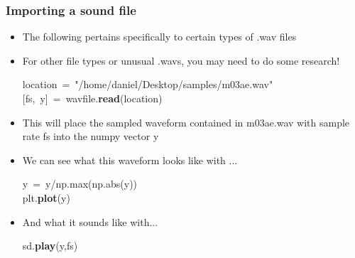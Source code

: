 \documentclass{beamer}\usepackage[]{graphicx}\usepackage[]{color}
\makeatletter
\newcommand{\hlstr}[1]{\textcolor[rgb]{0.192,0.494,0.8}{#1}}%
\newcommand{\hlopt}[1]{\textcolor[rgb]{0,0,0}{#1}}%
\newcommand{\hlstd}[1]{\textcolor[rgb]{0.345,0.345,0.345}{#1}}%
\newcommand{\hlkwb}[1]{\textcolor[rgb]{0.69,0.353,0.396}{#1}}%
\newcommand{\hlkwd}[1]{\textcolor[rgb]{0.737,0.353,0.396}{\textbf{#1}}}%
\newenvironment{kframe}{%
 \def\at@end@of@kframe{}%
 \ifinner\ifhmode%
  \def\at@end@of@kframe{\end{minipage}}%
  \begin{minipage}{\columnwidth}%
 \fi\fi%
 \def\FrameCommand##1{\hskip\@totalleftmargin \hskip-\fboxsep
 \colorbox{shadecolor}{##1}\hskip-\fboxsep
     \hskip-\linewidth \hskip-\@totalleftmargin \hskip\columnwidth}%
 \MakeFramed {\advance\hsize-\width
   \@totalleftmargin\z@ \linewidth\hsize
   \@setminipage}}%
 {\par\unskip\endMakeFramed%
 \at@end@of@kframe}
\newenvironment{knitrout}{}{} %
\makeatother
\begin{document}
\begin{frame}[fragile]
\frametitle{Importing a sound file}
\begin{itemize}
	\item The following pertains specifically to certain types of .wav files
	\item For other file types or unusual .wavs, you may need to do some research!
\begin{knitrout}
\color{fgcolor}\begin{kframe}
\noindent
\ttfamily
\hlstd{location\ }\hlopt{=\ }\hlstd{}\hlstr{"/home/daniel/Desktop/samples/m03ae.wav"}\hlstd{}\hspace*{\fill}\\
\hlopt{{[}}\hlstd{fs}\hlopt{,\ }\hlstd{y}\hlopt{{]}\ =\ }\hlstd{wavfile}\hlopt{.}\hlstd{}\hlkwd{read}\hlstd{}\hlopt{(}\hlstd{location}\hlopt{)}\hlstd{}\hspace*{\fill}
\mbox{}
\normalfont
\end{kframe}
\end{knitrout}

	\item This will place the sampled waveform contained in m03ae.wav with sample rate fs into the numpy vector y

	\item We can see what this waveform looks like with ...

\begin{knitrout}
\color{fgcolor}\begin{kframe}
\noindent
\ttfamily
\hlstd{y\ }\hlopt{=\ }\hlstd{y}\hlopt{/}\hlstd{np}\hlopt{.}\hlstd{}\hlkwb{max}\hlstd{}\hlopt{(}\hlstd{np}\hlopt{.}\hlstd{}\hlkwb{abs}\hlstd{}\hlopt{(}\hlstd{y}\hlopt{))}\hspace*{\fill}\\
\hlstd{plt}\hlopt{.}\hlstd{}\hlkwd{plot}\hlstd{}\hlopt{(}\hlstd{y}\hlopt{)}\hlstd{}\hspace*{\fill}
\mbox{}
\normalfont
\end{kframe}
\end{knitrout}

	\item And what it sounds like with...

\begin{knitrout}
\color{fgcolor}\begin{kframe}
\noindent
\ttfamily
\hlstd{sd}\hlopt{.}\hlstd{}\hlkwd{play}\hlstd{}\hlopt{(}\hlstd{y}\hlopt{,}\hlstd{fs}\hlopt{)}\hlstd{}\hspace*{\fill}
\mbox{}
\normalfont
\end{kframe}
\end{knitrout}
\end{itemize}
\end{frame}
\end{document}
